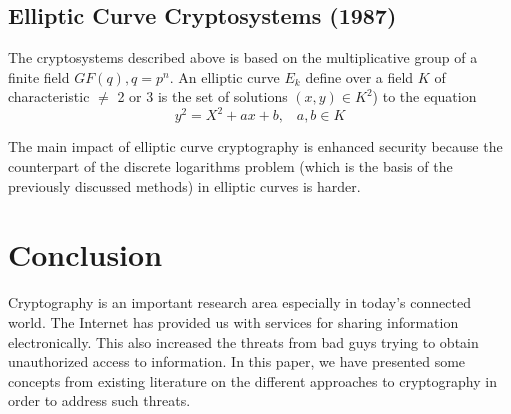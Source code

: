 \documentclass{article}
\begin{document}
\subsection{Elliptic Curve Cryptosystems (1987)}

The cryptosystems described above is based on the multiplicative group
of a finite field $GF(q),q=p^{n}$\cite{koblitz_elliptic_1987}. An
elliptic curve $E_{k}$ define over a field $K$ of characteristic
$\neq$ 2 or 3 is the set of solutions $(x,y)\in K^{2}$) to the equation
\[
y^{2}=X^{2}+ax+b,\;\;\; a,b\in K
\]


The main impact of elliptic curve cryptography is enhanced security
because the counterpart of the discrete logarithms problem (which
is the basis of the previously discussed methods) in elliptic curves
is harder\cite{koblitz_elliptic_1987}. 


\section{Conclusion} 

Cryptography is an important research area especially in today's connected world. The Internet has provided us with services for sharing information electronically. This also increased the threats from bad guys trying to obtain unauthorized access to information. In this paper, we have presented some concepts from existing literature on the different approaches to cryptography in order to address such threats.



\nocite{*}
\end{document}
